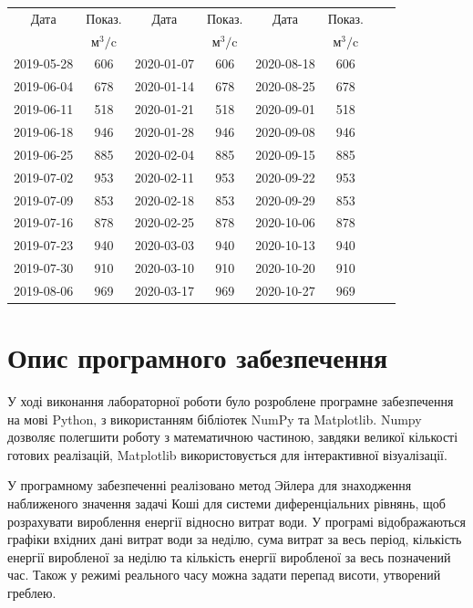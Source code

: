 \documentclass[12pt]{article}
\numberwithin{equation}{section}
\numberwithin{figure}{section}
\begin{document}
\begin{tabular}{|c|c||c|c||c|c||c|c|}\hline
Дата & Показ. & Дата & Показ. & Дата & Показ. \\
& $\text{м}^3/\text{c}$ && $\text{м}^3/\text{c}$ && $\text{м}^3/\text{c}$ \\\hline

2019-05-28 & 606 & 2020-01-07 & 606 & 2020-08-18 & 606 \\\hline
2019-06-04 & 678 & 2020-01-14 & 678 & 2020-08-25 & 678 \\\hline
2019-06-11 & 518 & 2020-01-21 & 518 & 2020-09-01 & 518 \\\hline
2019-06-18 & 946 & 2020-01-28 & 946 & 2020-09-08 & 946 \\\hline
2019-06-25 & 885 & 2020-02-04 & 885 & 2020-09-15 & 885 \\\hline
2019-07-02 & 953 & 2020-02-11 & 953 & 2020-09-22 & 953 \\\hline
2019-07-09 & 853 & 2020-02-18 & 853 & 2020-09-29 & 853 \\\hline
2019-07-16 & 878 & 2020-02-25 & 878 & 2020-10-06 & 878 \\\hline
2019-07-23 & 940 & 2020-03-03 & 940 & 2020-10-13 & 940 \\\hline
2019-07-30 & 910 & 2020-03-10 & 910 & 2020-10-20 & 910 \\\hline
2019-08-06 & 969 & 2020-03-17 & 969 & 2020-10-27 & 969 \\\hline

\end{tabular}

\newpage

\section{Опис програмного забезпечення}

У ході виконання лабораторної роботи було розроблене програмне забезпечення на мові Python, з використанням бібліотек NumPy та Matplotlib. Numpy дозволяє полегшити роботу з математичною частиною, завдяки великої кількості готових реалізацій, Matplotlib використовується для інтерактивної візуалізації.

У програмному забезпеченні реалізовано метод Эйлера для знаходження наближеного значення задачі Коші для системи диференціальних рівнянь, щоб розрахувати вироблення енергії відносно витрат води. У програмі відображаються графіки вхідних дані витрат води за неділю, сума витрат за весь період, кількість енергії виробленої за неділю та кількість енергії виробленої за весь позначений час. Також у режимі реального часу можна задати перепад висоти, утворений греблею.
\end{document}
